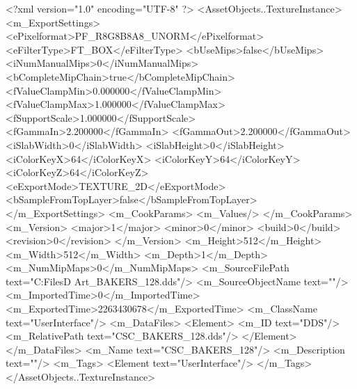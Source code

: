 <?xml version="1.0" encoding="UTF-8" ?>
<AssetObjects..TextureInstance>
	<m_ExportSettings>
		<ePixelformat>PF_R8G8B8A8_UNORM</ePixelformat>
		<eFilterType>FT_BOX</eFilterType>
		<bUseMips>false</bUseMips>
		<iNumManualMips>0</iNumManualMips>
		<bCompleteMipChain>true</bCompleteMipChain>
		<fValueClampMin>0.000000</fValueClampMin>
		<fValueClampMax>1.000000</fValueClampMax>
		<fSupportScale>1.000000</fSupportScale>
		<fGammaIn>2.200000</fGammaIn>
		<fGammaOut>2.200000</fGammaOut>
		<iSlabWidth>0</iSlabWidth>
		<iSlabHeight>0</iSlabHeight>
		<iColorKeyX>64</iColorKeyX>
		<iColorKeyY>64</iColorKeyY>
		<iColorKeyZ>64</iColorKeyZ>
		<eExportMode>TEXTURE_2D</eExportMode>
		<bSampleFromTopLayer>false</bSampleFromTopLayer>
	</m_ExportSettings>
	<m_CookParams>
		<m_Values/>
	</m_CookParams>
	<m_Version>
		<major>1</major>
		<minor>0</minor>
		<build>0</build>
		<revision>0</revision>
	</m_Version>
	<m_Height>512</m_Height>
	<m_Width>512</m_Width>
	<m_Depth>1</m_Depth>
	<m_NumMipMaps>0</m_NumMipMaps>
	<m_SourceFilePath text="C:\Users\Shadow\Desktop\Working Files\2D Art\Quarters\Bakers\CSC_BAKERS_128.dds"/>
	<m_SourceObjectName text=""/>
	<m_ImportedTime>0</m_ImportedTime>
	<m_ExportedTime>2263430678</m_ExportedTime>
	<m_ClassName text="UserInterface"/>
	<m_DataFiles>
		<Element>
			<m_ID text="DDS"/>
			<m_RelativePath text="CSC_BAKERS_128.dds"/>
		</Element>
	</m_DataFiles>
	<m_Name text="CSC_BAKERS_128"/>
	<m_Description text=""/>
	<m_Tags>
		<Element text="UserInterface"/>
	</m_Tags>
</AssetObjects..TextureInstance>

